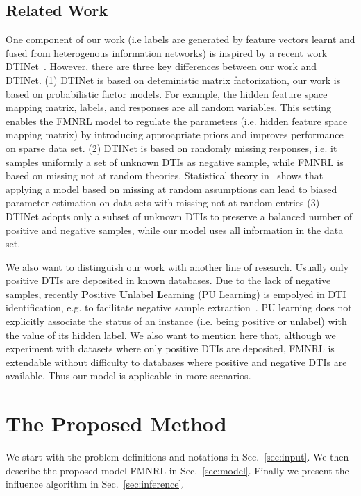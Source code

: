 \documentclass[sigconf,anonymous]{acmart}
\begin{document}
\subsection{Related Work}
One component of our work (i.e labels are generated by feature vectors learnt and fused from heterogenous information networks) is inspired by a recent work DTINet~\cite{Luo2017Network}. However, there are three key differences between our work and DTINet. (1) DTINet is based on deteministic matrix factorization, our work is based on probabilistic factor models. For example, the hidden feature space mapping matrix, labels, and responses are all random variables. This setting enables the FMNRL model to regulate the parameters (i.e. hidden feature space mapping matrix) by introducing approapriate priors and improves performance on sparse data set. (2) DTINet is based on randomly missing responses, i.e. it samples uniformly a set of unknown DTIs as negative sample, while FMNRL is based on missing not at random theories. Statistical theory in~\cite{Little1987Statistical} shows that applying a model based on missing at random assumptions can lead to biased parameter estimation on data sets with missing not at random entries (3) DTINet adopts only a subset of unknown DTIs to preserve a balanced number of positive and negative samples, while our model uses all information in the data set.

We also want to distinguish our work with another line of research. Usually only positive DTIs are deposited in known databases. Due to the lack of negative samples, recently \textbf{P}ositive \textbf{U}nlabel \textbf{L}earning (PU Learning) is empolyed in DTI identification, e.g. to facilitate negative sample extraction~\cite{Peng2017Screening}. PU learning does not explicitly associate the status of an instance (i.e. being positive or unlabel) with the value of its hidden label. We also want to mention here that, although we experiment with datasets where only positive DTIs are deposited, FMNRL is extendable without difficulty to databases where positive and negative DTIs are available. Thus our model is applicable in more scenarios.    



\section{The Proposed Method}\label{sec:method}
We start with the problem definitions and notations in Sec.~\ref{sec:input}. We then describe the proposed model FMNRL in Sec.~\ref{sec:model}. Finally we present the influence algorithm in Sec.~\ref{sec:inference}.
 
\end{document}

